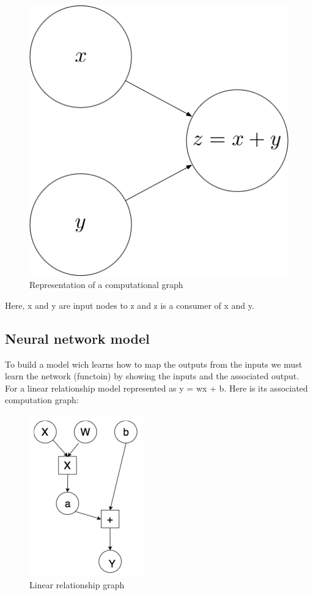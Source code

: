 \begin{figure}[!ht]
    \center
    \includegraphics[scale=0.4]{figures/computational_graph.png}
    \caption{Representation of a computational graph }
\end{figure}

Here, x and y are input nodes to z and z is a consumer of x and y. 
\subsection{Neural network model}
To build a model wich learns how to map the outputs from the inputs we must learn the network (functoin) by showing the inputs and the associated output. For a linear relationship model represented as y = wx + b. Here is its associated computation graph:

\begin{figure}[!ht]
    \center
    \includegraphics[scale=0.8]{figures/linear.png}
    \caption{Linear relationship graph }
\end{figure}

